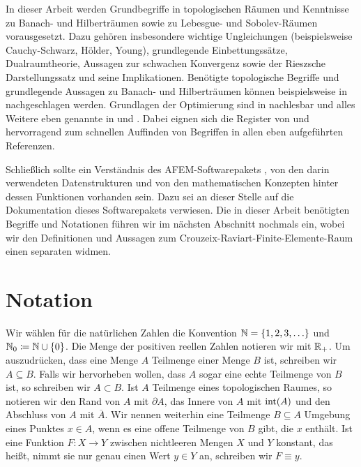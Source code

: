In dieser Arbeit werden Grundbegriffe in topologischen Räumen und Kenntnisse zu
Ba\-nach- und Hilberträumen sowie zu Lebesgue- und Sobolev-Räumen vorausgesetzt.
Dazu gehören insbesondere wichtige Ungleichungen (beispielsweise
Cauchy-Schwarz, Hölder, Young), grundlegende Einbettungssätze, Dualraumtheorie,
Aussagen zur schwachen Konvergenz sowie der Rieszsche Darstellungssatz und
seine Implikationen.
Benötigte topologische Begriffe und grundlegende Aussagen zu Banach- und
Hilberträumen können beispielsweise in \cite{Zei86} nachgeschlagen werden.
Grundlagen der Optimierung sind in \cite{Zei85} nachlesbar und alles Weitere
eben genannte in \cite{Zei90a} und \cite{Zei90b}. 
Dabei eignen sich die Register von \cite{Zei90b} und \cite{Zei85} hervorragend
zum schnellen Auffinden von Begriffen in allen eben aufgeführten
Referenzen.

Schließlich sollte ein Verständnis des AFEM-Softwarepakets \cite{Car09}, von
den darin verwendeten Datenstrukturen und von den mathematischen Konzepten
hinter dessen Funktionen vorhanden sein. 
Dazu sei an dieser Stelle auf die Dokumentation \cite{CGKNRR10} dieses
Softwarepakets verwiesen.
Die in dieser Arbeit benötigten Begriffe und Notationen führen wir im nächsten
Abschnitt nochmals ein, wobei wir den Definitionen und Aussagen zum
Crouzeix-Raviart-Finite-Elemente-Raum einen separaten
 widmen.


\section{Notation}
\label{sec:notation}

Wir wählen für die natürlichen Zahlen die Konvention
$\mathbb{N}=\{1,2,3,\ldots\}$ und $\mathbb{N}_0\coloneqq\mathbb{N}\cup\{0\}$. 
Die Menge der positiven reellen Zahlen notieren wir mit $\mathbb{R}_+$.
Um auszudrücken, dass eine Menge $A$ Teilmenge einer Menge $B$ ist, schreiben
wir $A\subseteq B$. Falls wir hervorheben wollen, dass $A$ sogar eine echte
Teilmenge von $B$ ist, so schreiben wir $A\subset B$.
Ist $A$ Teilmenge eines topologischen Raumes, so notieren wir den Rand von $A$
mit $\partial A$, das Innere von $A$ mit $\operatorname{int}(A)$ und den Abschluss
von $A$ mit $\overline A$.
Wir nennen weiterhin eine Teilmenge $B\subseteq A$ Umgebung eines Punktes $x\in
A$, wenn es eine offene Teilmenge von $B$ gibt, die $x$ enthält.
Ist eine Funktion $F:X\to Y$ zwischen nichtleeren Mengen $X$ und $Y$ konstant,
das heißt, nimmt sie nur genau einen Wert $y\in Y$ an, schreiben wir $F\equiv
y$.

